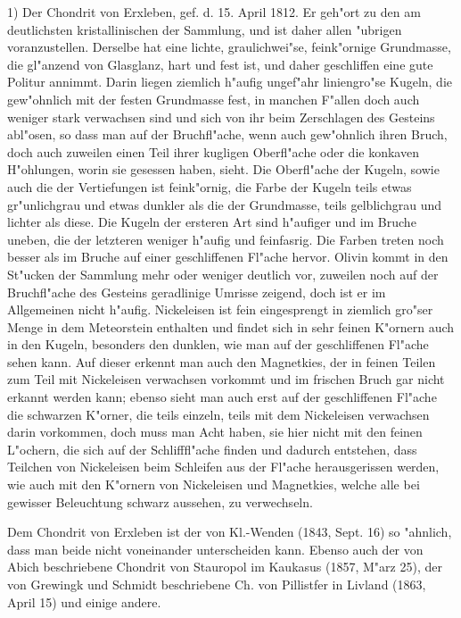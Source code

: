 \documentclass[a4paper, 11pt, oneside, german]{article}
\begin{document}
1) Der Chondrit von Erxleben, gef. d. 15. April 1812. Er geh"ort zu den am deutlichsten kristallinischen der Sammlung, und ist daher allen "ubrigen voranzustellen. Derselbe hat eine lichte, graulichwei"se, feink"ornige Grundmasse, die gl"anzend von Glasglanz, hart und fest ist, und daher geschliffen eine gute Politur annimmt. Darin liegen ziemlich h"aufig ungef"ahr liniengro"se Kugeln, die gew"ohnlich mit der festen Grundmasse fest, in manchen F"allen doch auch weniger stark verwachsen sind und sich von ihr beim Zerschlagen des Gesteins abl"osen, so dass man auf der Bruchfl"ache, wenn auch gew"ohnlich ihren Bruch, doch auch zuweilen einen Teil ihrer kugligen Oberfl"ache oder die konkaven H"ohlungen, worin sie gesessen haben, sieht. Die Oberfl"ache der Kugeln, sowie auch die der Vertiefungen ist feink"ornig, die Farbe der Kugeln teils etwas gr"unlichgrau und etwas dunkler als die der Grundmasse, teils gelblichgrau und lichter als diese. Die Kugeln der ersteren Art sind h"aufiger und im Bruche uneben, die der letzteren weniger h"aufig und feinfasrig. Die Farben treten noch besser als im Bruche auf einer geschliffenen Fl"ache hervor. Olivin kommt in den St"ucken der Sammlung mehr oder weniger deutlich vor, zuweilen noch auf der Bruchfl"ache des Gesteins geradlinige Umrisse zeigend, doch ist er im Allgemeinen nicht h"aufig. Nickeleisen ist fein eingesprengt in ziemlich gro"ser Menge in dem Meteorstein enthalten und findet sich in sehr feinen K"ornern auch in den Kugeln, besonders den dunklen, wie man auf der geschliffenen Fl"ache sehen kann. Auf dieser erkennt man auch den Magnetkies, der in feinen Teilen zum Teil mit Nickeleisen verwachsen vorkommt und im frischen Bruch gar nicht erkannt werden kann; ebenso sieht man auch erst auf der geschliffenen Fl"ache die schwarzen K"orner, die teils einzeln, teils mit dem Nickeleisen verwachsen darin vorkommen, doch muss man Acht haben, sie hier nicht mit den feinen L"ochern, die sich auf der Schlifffl"ache finden und dadurch entstehen, dass Teilchen von Nickeleisen beim Schleifen aus der Fl"ache herausgerissen werden, wie auch mit den K"ornern von Nickeleisen und Magnetkies, welche alle bei gewisser Beleuchtung schwarz aussehen, zu verwechseln.

Dem Chondrit von Erxleben ist der von Kl.-Wenden (1843, Sept. 16) so "ahnlich, dass man beide nicht voneinander unterscheiden kann. Ebenso auch der von Abich beschriebene Chondrit von Stauropol im Kaukasus (1857, M"arz 25), der von Grewingk und Schmidt beschriebene Ch. von Pillistfer in Livland (1863, April 15) und einige andere.
\end{document}
